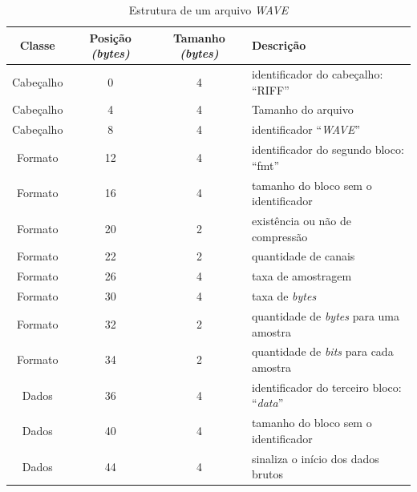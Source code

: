\documentclass[a4paper,12pt,twoside,openright]{report}
\begin{document}
\begin{table}
	\centering
	\caption{Estrutura de um arquivo \textit{WAVE}}
	\begin{tabular}{|c|c|c|l|}
		\hline
		\hline
		\textbf{Classe} & \textbf{Posi\c{c}\~{a}o \textit{(bytes)}} & \textbf{Tamanho \textit{(bytes)}} & \textbf{Descri\c{c}\~{a}o}\\
		\hline
		\hline
		Cabe\c{c}alho & 0 & 4 & identificador do cabe\c{c}alho: ``RIFF''\\
		\hline
		Cabe\c{c}alho & 4 & 4 & Tamanho do arquivo \\
		\hline
		Cabe\c{c}alho & 8 & 4 & identificador ``\textit{WAVE}''\\
		\hline
		\hline
		Formato & 12 & 4 & identificador do segundo bloco: ``fmt''\\
		\hline
		Formato & 16 & 4 & tamanho do bloco sem o identificador\\
		\hline
		Formato & 20 & 2 & exist\^{e}ncia ou n\~{a}o de compress\~{a}o\\
		\hline
		Formato & 22 & 2 & quantidade de canais\\
		\hline
		Formato & 26 & 4 & taxa de amostragem\\
		\hline
		Formato & 30 & 4 & taxa de \textit{bytes}\\
		\hline
		Formato & 32 & 2 & quantidade de \textit{bytes} para uma amostra\\
		\hline
		Formato & 34 & 2 & quantidade de \textit{bits} para cada amostra\\
		\hline
		\hline
		Dados & 36 & 4 & identificador do terceiro bloco: ``\textit{data}''\\
		\hline
		Dados & 40 & 4 & tamanho do bloco sem o identificador\\
		\hline
		Dados & 44 & 4 & sinaliza o in\'{i}cio dos dados brutos \\
		\hline
	\end{tabular}
	\label{tabelawav}
\end{table}  
\end{document}
